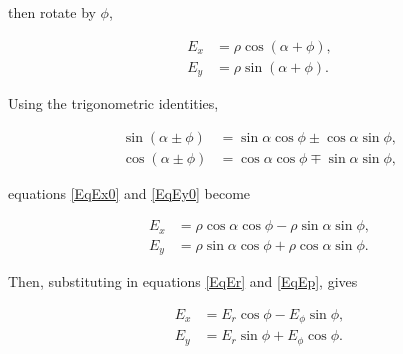 \documentclass[]{article}
\begin{document}
	then rotate by $\phi$,
	
	\begin{align}
		E_x &= \rho \cos{(\alpha + \phi)}, \label{EqEx0}\\
		E_y &= \rho \sin{(\alpha + \phi)}. \label{EqEy0}		
	\end{align}
	
	Using the trigonometric identities,
	
	\begin{align}
		\sin{(\alpha \pm \phi)} &= \sin\alpha\cos\phi \pm \cos\alpha\sin\phi, \\
		\cos{(\alpha \pm \phi)} &= \cos\alpha\cos\phi \mp \sin\alpha\sin\phi,
	\end{align}
	
	equations \ref{EqEx0} and \ref{EqEy0} become 
	
	\begin{align}
		E_x &= \rho\cos\alpha\cos\phi - \rho\sin\alpha\sin\phi, \\
		E_y &= \rho\sin\alpha\cos\phi + \rho\cos\alpha\sin\phi.
	\end{align}
	
	Then, substituting in equations \ref{EqEr} and \ref{EqEp}, gives
	
	\begin{align}
		E_x &= E_r\cos\phi - E_\phi\sin\phi, \\
		E_y &= E_r\sin\phi + E_\phi\cos\phi.
	\end{align}



\end{document}
